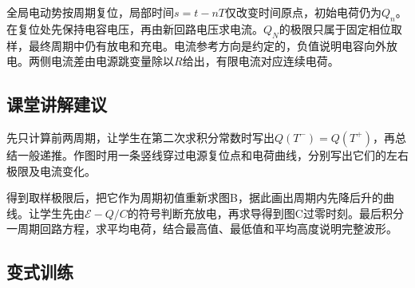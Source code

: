 \documentclass[UTF8,fontset=fandol,a4paper,11pt]{ctexart}
\begin{document}
全局电动势按周期复位，局部时间$s=t-nT$仅改变时间原点，初始电荷仍为$Q_n$。在复位处先保持电容电压，再由新回路电压求电流。$Q_N$的极限只属于固定相位取样，最终周期中仍有放电和充电。电流参考方向是约定的，负值说明电容向外放电。两侧电流差由电源跳变量除以$R$给出，有限电流对应连续电荷。



\subsection*{课堂讲解建议}

先只计算前两周期，让学生在第二次求积分常数时写出$Q(T^-)=Q(T^+)$，再总结一般递推。作图时用一条竖线穿过电源复位点和电荷曲线，分别写出它们的左右极限及电流变化。

得到取样极限后，把它作为周期初值重新求图B，据此画出周期内先降后升的曲线。让学生先由$\mathcal E-Q/C$的符号判断充放电，再求导得到图C过零时刻。最后积分一周期回路方程，求平均电荷，结合最高值、最低值和平均高度说明完整波形。



\subsection*{变式训练}
\end{document}
